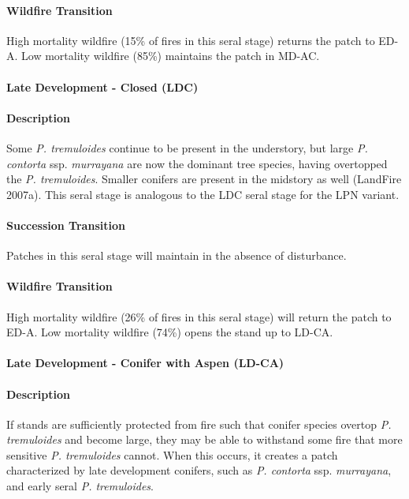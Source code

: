 \paragraph{Wildfire Transition} High mortality wildfire (15\% of fires in this seral stage) returns the patch to ED-A. Low mortality wildfire (85\%) maintains the patch in MD-AC.

\noindent\hrulefill

\paragraph{Late Development - Closed (LDC)}

\paragraph{Description} Some \emph{P. tremuloides} continue to be present in the understory, but large\emph{ P. contorta} ssp. \emph{murrayana} are now the dominant tree species, having overtopped the \emph{P. tremuloides}. Smaller conifers are present in the midstory as well (LandFire 2007a). This seral stage is analogous to the LDC seral stage for the LPN variant.

\paragraph{Succession Transition} Patches in this seral stage will maintain in the absence of disturbance.

\paragraph{Wildfire Transition} High mortality wildfire (26\% of fires in this seral stage) will return the patch to ED-A. Low mortality wildfire (74\%) opens the stand up to LD-CA.

\noindent\hrulefill


\paragraph{Late Development - Conifer with Aspen (LD-CA)}

\paragraph{Description} If stands are sufficiently protected from fire such that conifer species overtop \emph{P. tremuloides} and become large, they may be able to withstand some fire that more sensitive \emph{P. tremuloides} cannot. When this occurs, it creates a patch characterized by late development conifers, such as \emph{P. contorta} ssp. \emph{murrayana}, and early seral \emph{P. tremuloides}. 

